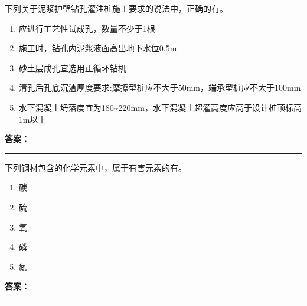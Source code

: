 \documentclass[UTF8,fontset=fandol,11pt]{ctexart}
\newcommand{\answerline}{\textcolor{answerred}{\rule{2.4cm}{0.7pt}}}
\begin{document}
\begin{quizbox}[title={乱序第 195 题｜第二章桩基础工程}]

下列关于泥浆护壁钻孔灌注桩施工要求的说法中，正确的有。\\

\begin{enumerate}[label=\Alph*.]

\item 应进行工艺性试成孔，数量不少于1根

\item 施工时，钻孔内泥浆液面高出地下水位0.5m

\item 砂土层成孔宜选用正循环钻机

\item 清孔后孔底沉渣厚度要求:摩擦型桩应不大于50mm，端承型桩应不大于100mm

\item 水下混凝土坍落度宜为180\textasciitilde{}220mm，水下混凝土超灌高度应高于设计桩顶标高1m以上

\end{enumerate}

\textbf{\textcolor{answerred}{答案：}} \answerline

\end{quizbox}

\vspace{0.2em}

\begin{quizbox}[title={乱序第 196 题｜第四章混凝土结构工程}]

下列钢材包含的化学元素中，属于有害元素的有。\\

\begin{enumerate}[label=\Alph*.]

\item 碳

\item 硫

\item 氧

\item 磷

\item 氮

\end{enumerate}

\textbf{\textcolor{answerred}{答案：}} \answerline

\end{quizbox}

\vspace{0.2em}
\end{document}
